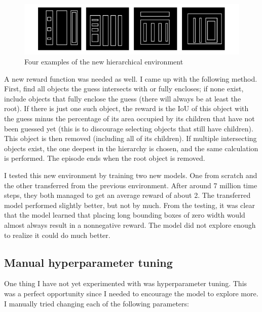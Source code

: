 \documentclass[
  digital,     %
  oneside,     %
  nosansbold,  %
  nocolorbold, %
  lof,         %
  lot,         %
]{fithesis4}
\begin{document}
\begin{figure}
    \centering
    \includegraphics[width=1\linewidth]{env_examples/env7.pdf}
    \caption{Four examples of the new hierarchical environment}
    \label{fig:env7}
\end{figure}

A new reward function was needed as well. I came up with the following method. First, find all objects the guess intersects with or fully encloses; if none exist, include objects that fully enclose the guess (there will always be at least the root). If there is just one such object, the reward is the IoU of this object with the guess minus the percentage of its area occupied by its children that have not been guessed yet (this is to discourage selecting objects that still have children). This object is then removed (including all of its children). If multiple intersecting objects exist, the one deepest in the hierarchy is chosen, and the same calculation is performed. The episode ends when the root object is removed.

I tested this new environment by training two new models. One from scratch and the other transferred from the previous environment. After around 7 million time steps, they both managed to get an average reward of about 2. The transferred model performed slightly better, but not by much. From the testing, it was clear that the model learned that placing long bounding boxes of zero width would almost always result in a nonnegative reward. The model did not explore enough to realize it could do much better.

\subsection{Manual hyperparameter tuning}

One thing I have not yet experimented with was hyperparameter tuning. This was a perfect opportunity since I needed to encourage the model to explore more. I manually tried changing each of the following parameters:
\end{document}
